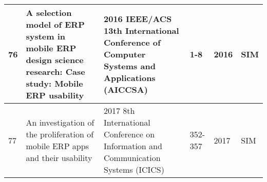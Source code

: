 \begin{landscape}
\begin{longtable}{||p{1.7cm}|p{11.0cm}|p{6.0cm}|p{1.7cm}|p{1cm}|p{1cm}||}
	\hline
	76 & A selection model of ERP system in mobile ERP design science research: Case study: Mobile ERP usability & 2016 IEEE/ACS 13th International Conference of Computer Systems and Applications (AICCSA) & 1-8 & 2016 & SIM \\ 
	\hline
	77 & An investigation of the proliferation of mobile ERP apps and their usability & 2017 8th International Conference on Information and Communication Systems (ICICS) & 352-357 & 2017 & SIM 
	\hline
 \end{longtable}
\end{landscape}